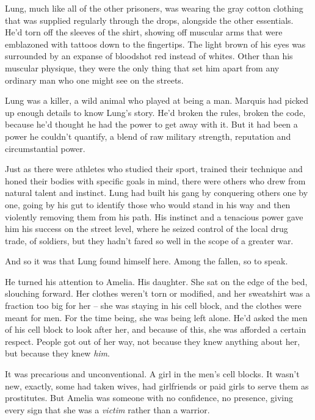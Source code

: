 Lung, much like all of the other prisoners, was wearing the gray cotton clothing that was supplied regularly through the drops, alongside the other essentials.  He'd torn off the sleeves of the shirt, showing off muscular arms that were emblazoned with tattoos down to the fingertips.  The light brown of his eyes was surrounded by an expanse of bloodshot red instead of whites.  Other than his muscular physique, they were the only thing that set him apart from any ordinary man who one might see on the streets.



Lung was a killer, a wild animal who played at being a man.  Marquis had picked up enough details to know Lung's story.  He'd broken the rules, broken the code, because he'd thought he had the power to get away with it.  But it had been a power he couldn't quantify, a blend of raw military strength, reputation and circumstantial power.



Just as there were athletes who studied their sport, trained their technique and honed their bodies with specific goals in mind, there were others who drew from natural talent and instinct.  Lung had built his gang by conquering others one by one, going by his gut to identify those who would stand in his way and then violently removing them from his path.  His instinct and a tenacious power gave him his success on the street level, where he seized control of the local drug trade, of soldiers, but they hadn't fared so well in the scope of a greater war.



And so it was that Lung found himself here.  Among the fallen, so to speak.



He turned his attention to Amelia.  His daughter.  She sat on the edge of the bed, slouching forward.  Her clothes weren't torn or modified, and her sweatshirt was a fraction too big for her – she was staying in his cell block, and the clothes were meant for men.  For the time being, she was being left alone.  He'd asked the men of his cell block to look after her, and because of this, she was afforded a certain respect.  People got out of her way, not because they knew anything about her, but because they knew \emph{him}.



It was precarious and unconventional.  A girl in the men's cell blocks.  It wasn't new, exactly, some had taken wives, had girlfriends or paid girls to serve them as prostitutes.  But Amelia was someone with no confidence, no presence, giving every sign that she was a \emph{victim} rather than a warrior.



